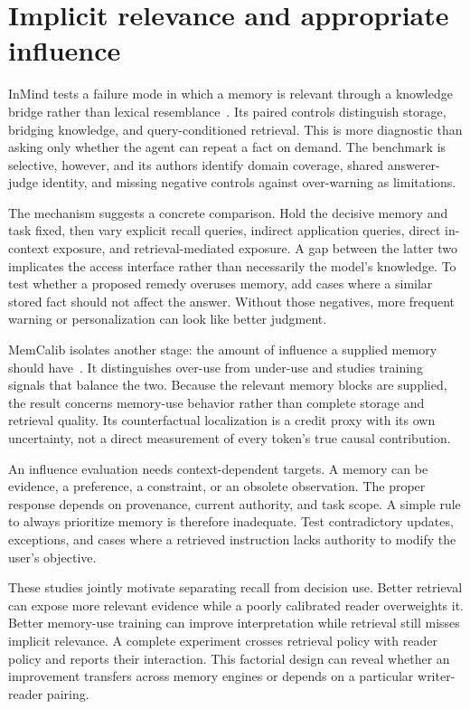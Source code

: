 \section{Implicit relevance and appropriate influence}\label{sec:C27:influence}
InMind tests a failure mode in which a memory is relevant through a knowledge bridge rather than lexical resemblance~\cite{inmind2026}. Its paired controls distinguish storage, bridging knowledge, and query-conditioned retrieval. This is more diagnostic than asking only whether the agent can repeat a fact on demand. The benchmark is selective, however, and its authors identify domain coverage, shared answerer-judge identity, and missing negative controls against over-warning as limitations.

The mechanism suggests a concrete comparison. Hold the decisive memory and task fixed, then vary explicit recall queries, indirect application queries, direct in-context exposure, and retrieval-mediated exposure. A gap between the latter two implicates the access interface rather than necessarily the model's knowledge. To test whether a proposed remedy overuses memory, add cases where a similar stored fact should not affect the answer. Without those negatives, more frequent warning or personalization can look like better judgment.

MemCalib isolates another stage: the amount of influence a supplied memory should have~\cite{memcalib2026}. It distinguishes over-use from under-use and studies training signals that balance the two. Because the relevant memory blocks are supplied, the result concerns memory-use behavior rather than complete storage and retrieval quality. Its counterfactual localization is a credit proxy with its own uncertainty, not a direct measurement of every token's true causal contribution.

An influence evaluation needs context-dependent targets. A memory can be evidence, a preference, a constraint, or an obsolete observation. The proper response depends on provenance, current authority, and task scope. A simple rule to always prioritize memory is therefore inadequate. Test contradictory updates, exceptions, and cases where a retrieved instruction lacks authority to modify the user's objective.

These studies jointly motivate separating recall from decision use. Better retrieval can expose more relevant evidence while a poorly calibrated reader overweights it. Better memory-use training can improve interpretation while retrieval still misses implicit relevance. A complete experiment crosses retrieval policy with reader policy and reports their interaction. This factorial design can reveal whether an improvement transfers across memory engines or depends on a particular writer-reader pairing.

